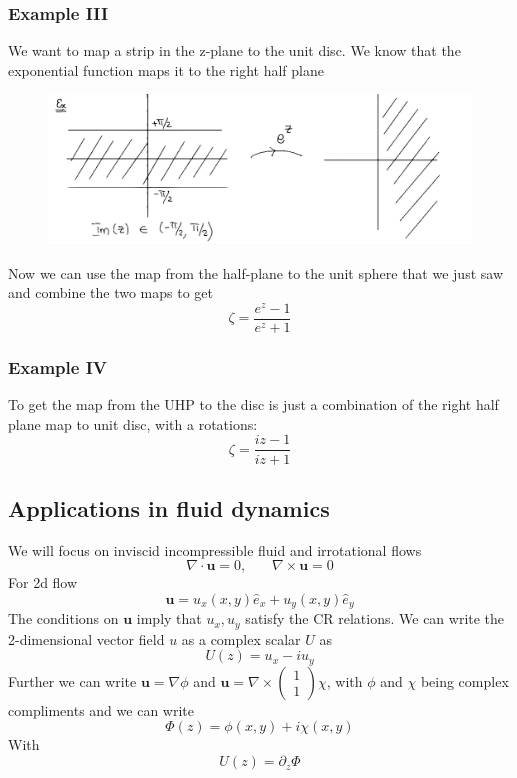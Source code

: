\documentclass[a4paper,12pt]{article}
\begin{document}
\subsubsection{Example III}
We want to map a strip in the z-plane to the unit disc. We know that the exponential function maps it to the right half plane
\begin{figure}[H]
	\centering
	\includegraphics[width=0.7\linewidth]{7}
	\caption{}
	\label{fig:4}
\end{figure}
Now we can use the map from the half-plane to the unit sphere that we just saw and combine the two maps to get
\begin{equation}
\zeta = \frac{e^z-1}{e^z+1}
\end{equation}
\subsubsection{Example IV}
To get the map from the UHP to the disc is just a combination of the right half plane map to unit disc, with a rotations:
\begin{equation}
\zeta=\frac{iz-1}{iz+1}
\end{equation}
\subsection{Applications in fluid dynamics}
We will focus on inviscid incompressible fluid and irrotational flows
\begin{equation}
\nabla\cdot \bm u=0,~~~~~~~~\nabla\times \bm u =0
\end{equation}
For 2d flow
\begin{equation}
\bm u=u_x(x,y)\hat e_x+u_y(x,y)\hat e_y
\end{equation}
The conditions on $\bm u$ imply that $u_x,u_y$ satisfy the CR relations. We can write the 2-dimensional vector field $u$ as a complex scalar $U$ as 
\begin{equation}
U(z)=u_x-iu_y
\end{equation}
Further we can write $\bm u=\nabla \phi$ and $\bm u=\nabla \times \begin{pmatrix}
1\\
1
\end{pmatrix}\chi$, with $\phi$ and $\chi$ being complex compliments and we can write
\begin{equation}
\Phi(z)=\phi(x,y)+i\chi(x,y)
\end{equation}
With
\begin{equation}
U(z)=\partial_z\Phi
\end{equation}
\end{document}
